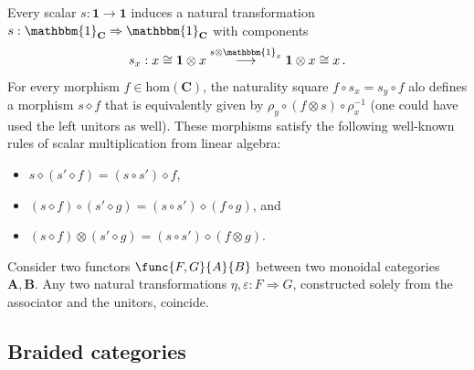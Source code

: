     \begin{property}
        Every scalar $s:\mathbf{1}\rightarrow\mathbf{1}$ induces a natural transformation $s:\mathbbm{1}_{\mathbf{C}}\Rightarrow\mathbbm{1}_{\mathbf{C}}$ with components
        \begin{gather}
            s_x:x\cong\mathbf{1}\otimes x\overset{s\otimes\mathbbm{1}_x}{\longrightarrow}\mathbf{1}\otimes x\cong x\,.
        \end{gather}
        For every morphism $f\in\mathrm{hom}(\mathbf{C})$, the naturality square $f\circ s_x=s_y\circ f$ alo defines a morphism $s\diamond f$ that is equivalently given by $\rho_y\circ(f\otimes s)\circ\rho^{-1}_x$ (one could have used the left unitors as well). These morphisms satisfy the following well-known rules of scalar multiplication from linear algebra:
        \begin{itemize}
            \item $s\diamond(s'\diamond f) = (s\circ s')\diamond f$,
            \item $(s\diamond f)\circ(s'\diamond g) = (s\circ s')\diamond(f\circ g)$, and
            \item $(s\diamond f)\otimes(s'\diamond g) = (s\circ s')\diamond(f\otimes g)$.
        \end{itemize}
    \end{property}


    \begin{theorem}
        Consider two functors $\func{F,G}{A}{B}$ between two monoidal categories $\mathbf{A},\mathbf{B}$. Any two natural transformations $\eta,\varepsilon:F\Rightarrow G$, constructed solely from the associator and the unitors, coincide.
    \end{theorem}

\subsection{Braided categories}

